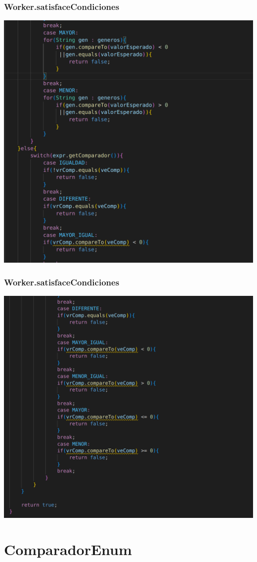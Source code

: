 \documentclass{beamer}
\begin{document}
\begin{frame}
\frametitle{Worker.satisfaceCondiciones}
\includegraphics[width=0.9\linewidth]{worker_satisfacecondiciones3}
\end{frame}

\begin{frame}
\frametitle{Worker.satisfaceCondiciones}
\includegraphics[width=0.9\linewidth]{worker_satisfacecondiciones4}
\end{frame}

\section{ComparadorEnum}
\end{document}

